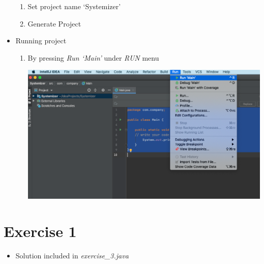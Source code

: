 \documentclass[12pt]{article}
\begin{document}
\begin{itemize}
\begin{enumerate}[1.]
        \item Set project name `Systemizer'

        \item Generate Project
    \end{enumerate}

    \item Running project

    \begin{enumerate}[1.]
        \item By pressing \textit{Run `Main'} under \textit{RUN} menu

        \begin{center}
        \includegraphics[width=\linewidth]{images/part_2_notes_4.png}
        \end{center}
    \end{enumerate}

\end{itemize}

\bigskip

\section{Exercise 1}

\bigskip

\begin{itemize}
    \item Solution included in \textit{exercise\_3.java}
\end{itemize}
\end{document}
